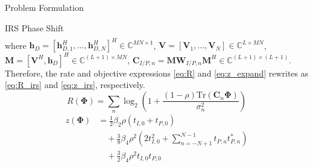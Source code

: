 \documentclass[journal]{IEEEtran}
\begin{document}
\begin{section}{Problem Formulation}
\begin{subsection}{IRS Phase Shift}
\begin{equation}
\begin{split}
			\end{split}
		\end{equation}
		where $\boldsymbol{h}_D=[\boldsymbol{h}_{D,1}^H,\dots,\boldsymbol{h}_{D,N}^H]^H \in \mathbb{C}^{MN \times 1}$, $\boldsymbol{V}=[\boldsymbol{V}_1,\dots,\boldsymbol{V}_N] \in \mathbb{C}^{L \times MN}$, $\boldsymbol{M}=[\boldsymbol{V}^H, \boldsymbol{h}_{D}]^H \in \mathbb{C}^{(L+1) \times MN}$, $\boldsymbol{C}_{I/P,n}=\boldsymbol{M}\boldsymbol{W}_{I/P,n}\boldsymbol{M}^H \in \mathbb{C}^{(L+1)\times(L+1)}$. Therefore, the rate and objective expressions \ref{eq:R} and \ref{eq:z_expand} rewrites as \ref{eq:R_irs} and \ref{eq:z_irs}, respectively.
		\begin{equation}\label{eq:R_irs}
			R(\boldsymbol{\Phi}) = \sum_{n}{\log_2\left(1+\frac{(1-\rho)\mathrm{Tr}(\boldsymbol{C}_n\boldsymbol{\Phi})}{\sigma_n^2}\right)}
		\end{equation}
		\begin{equation}\label{eq:z_irs}
			\begin{split}
				z(\boldsymbol{\Phi})
				&=\frac{1}{2}{\beta_2}{\rho}(t_{I,0}+t_{P,0})\\
				&\quad+\frac{3}{8}{\beta_4}{\rho^2} \left(2t_{I,0}^2 + \sum_{n=-N+1}^{N-1}{t_{P,n}t_{P,n}^*}\right)\\
				&\quad+\frac{3}{2}{\beta_4}{\rho^2}t_{I,0}t_{P,0}
			\end{split}
		\end{equation}


\end{subsection}
\end{section}
\end{document}
